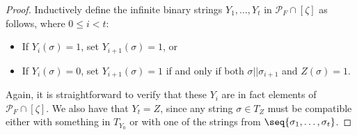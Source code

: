 \begin{proof}
    Inductively define the infinite binary strings $Y_1, \dots, Y_t$ in $\mathcal{P}_F \cap [\zeta]$ as follows, where $0 \leq i < t$:
    \begin{itemize}
        \item If $Y_i(\sigma) = 1$, set $Y_{i + 1}(\sigma) = 1$, or
        \item If $Y_i(\sigma) = 0$, set $Y_{i + 1}(\sigma) = 1$ if and only if both $\sigma || \sigma_{i + 1}$ and $Z(\sigma) = 1$.
    \end{itemize}
    
    Again, it is straightforward to verify that these $Y_i$ are in fact elements of $\mathcal{P}_F \cap [\zeta]$. We also have that $Y_t = Z$, since any string $\sigma \in T_Z$ must be compatible either with something in $T_{Y_0}$ or with one of the strings from $\seq{\sigma_1, \dots , \sigma_t}$.
    

\end{proof}
